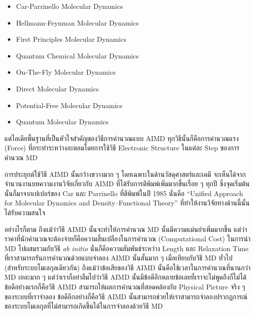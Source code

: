 \begin{itemize}[topsep=0pt,noitemsep]
  \setlength\itemsep{1em}
  \item Car-Parrinello Molecular Dynamics

  \item Hellmann-Feynman Molecular Dynamics

  \item First Principles Molecular Dynamics

  \item Quantum Chemical Molecular Dynamics

  \item On-The-Fly Molecular Dynamics

  \item Direct Molecular Dynamics

  \item Potential-Free Molecular Dynamics

  \item Quantum Molecular Dynamics
\end{itemize}

แต่ไอเดียพื้นฐานที่เป็นหัวใจสำคัญของวิธีการคำนวณแบบ AIMD ทุกวิธีนั้นก็คือการคำนวณแรง (Force) ที่กระทำระหว่างอะตอมโดยการใช้วิธี
Electronic Structure ในแต่ละ Step ของการคำนวณ MD

การประยุกต์ใช้วิธี AIMD นั้นกว้างขวางมาก ๆ โดยเฉพาะในด้านวัสดุศาสตร์และเคมี จะเห็นได้จากจำนวนงานบทความงานวิจัยเกี่ยวกับ AIMD
ที่ได้รับการตีพิมพ์เพิ่มมากขึ้นเรื่อย ๆ ทุกปี ซึ่งจุดเริ่มต้นนั้นก็มาจากเปเปอร์ของ Car และ Parrinello ที่ตีพิมพ์ในปี 1985 นั่นคือ
\enquote{Uniﬁed Approach for Molecular Dynamics and Density–Functional Theory} ที่ทำให้งานวิจัยทางด้านนี้นั้นได้รับความสนใจ

อย่างไรก็ตาม ถึงแม้ว่าวิธี AIMD นั้นจะทำให้การคำนวณ MD นั้นมีความแม่นยำเพิ่มมากขึ้น แต่ว่าราคาที่นักคำนวณจะต้องจ่ายก็คือความสิ้นเปลืองในการคำนวณ
(Computational Cost) ในการนำ MD ไปผสมรวมกับวิธี \textit{ab initio} นั่นก็คือความสัมพันธ์ระหว่าง Length และ Relaxation Time
ที่เราสามารถรันการคำนวณด้วยแบบจำลอง AIMD นั้นสั้นมาก ๆ เมื่อเทียบกับวิธี MD ทั่วไป (สำหรับระบบโมเลกุลเดียวกัน) ถึงแม้ว่าข้อเสียของวิธี AIMD
นั้นคือใช้เวลาในการคำนวณที่นานกว่า MD เยอะมาก ๆ แต่ว่าเราก็อย่าลืมไปว่าวิธี AIMD นั้นมีข้อดีอีกหลายข้อเลยที่เราจะไม่พูดถึงก็ไม่ได้
ข้อดีอย่างแรกก็คือวิธี AIMD สามารถให้ผลการคำนวณที่สอดคล้องกับ Physical Picture จริง ๆ ของระบบที่เราจำลอง ข้อดีอีกอย่างก็คือวิธี AIMD
นั้นสามารถช่วยให้เราสามารถจำลองปรากฏการณ์ของระบบโมเลกุลที่ไม่สามารถเกิดขึ้นได้ในการจำลองด้วยวิธี MD

